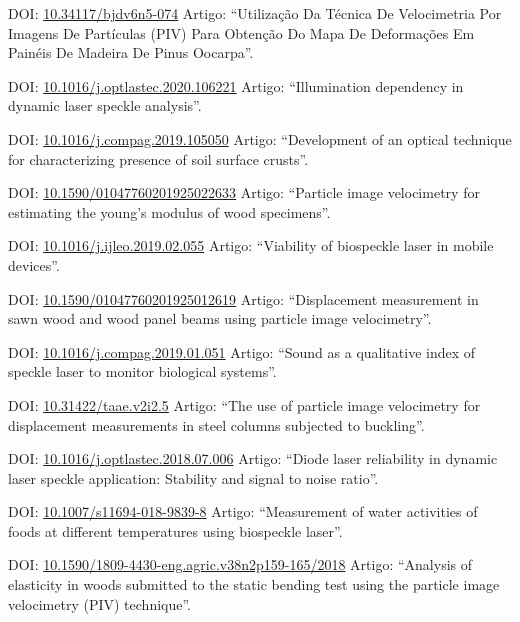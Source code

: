 \documentclass[11pt,a4paper,sans]{moderncv} %
\newcommand{\doiurl}[1]{\href{https://doi.org/#1}{#1}}
\begin{document}
	      {DOI: \doiurl{10.34117/bjdv6n5-074}}{}{}
	      {Artigo: ``Utilização Da Técnica De Velocimetria Por Imagens De Partículas (PIV) Para Obtenção Do Mapa De Deformações Em Painéis De Madeira De Pinus Oocarpa''.}

	      {DOI: \doiurl{10.1016/j.optlastec.2020.106221}}{}{}
	      {Artigo: ``Illumination dependency in dynamic laser speckle analysis''.}


	      {DOI: \doiurl{10.1016/j.compag.2019.105050}}{}{}
	      {Artigo: ``Development of an optical technique for characterizing presence of soil surface crusts''.}


	      {DOI: \doiurl{10.1590/01047760201925022633}}{}{}
	      {Artigo: ``Particle image velocimetry for estimating the young’s modulus of wood specimens''.}

	      {DOI: \doiurl{10.1016/j.ijleo.2019.02.055}}{}{}
	      {Artigo: ``Viability of biospeckle laser in mobile devices''.}

	      {DOI: \doiurl{10.1590/01047760201925012619}}{}{}
	      {Artigo: ``Displacement measurement in sawn wood and wood panel beams using particle image velocimetry''.}

	      {DOI: \doiurl{10.1016/j.compag.2019.01.051}}{}{}
	      {Artigo: ``Sound as a qualitative index of speckle laser to monitor biological systems''.}

	      {DOI: \doiurl{10.31422/taae.v2i2.5}}{}{}
	      {Artigo: ``The use of particle image velocimetry for displacement measurements in steel columns subjected to buckling''.}
	      
	      {DOI: \doiurl{10.1016/j.optlastec.2018.07.006}}{}{}
	      {Artigo: ``Diode laser reliability in dynamic laser speckle application: Stability and signal to noise ratio''.}
	      
	      {DOI: \doiurl{10.1007/s11694-018-9839-8}}{}{}
	      {Artigo: ``Measurement of water activities of foods at different temperatures using biospeckle laser''.}

	      {DOI: \doiurl{10.1590/1809-4430-eng.agric.v38n2p159-165/2018}}{}{}
	      {Artigo: ``Analysis of elasticity in woods submitted to the static bending test using the particle image velocimetry (PIV) technique''.}
\end{document}
